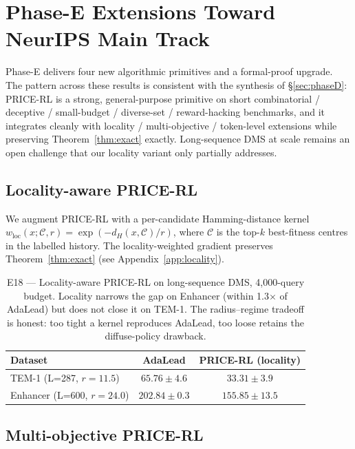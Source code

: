 \section{Phase-E Extensions Toward NeurIPS Main Track}
\label{sec:phaseE}

Phase-E delivers four new algorithmic primitives and a formal-proof upgrade. The pattern across these results is consistent with the synthesis of §\ref{sec:phaseD}: PRICE-RL is a strong, general-purpose primitive on short combinatorial / deceptive / small-budget / diverse-set / reward-hacking benchmarks, and it integrates cleanly with locality / multi-objective / token-level extensions while preserving Theorem~\ref{thm:exact} exactly. Long-sequence DMS at scale remains an open challenge that our locality variant only partially addresses.

\subsection{Locality-aware PRICE-RL}
\label{sec:e18}

We augment PRICE-RL with a per-candidate Hamming-distance kernel $w_{\mathrm{loc}}(x; \mathcal C, r) = \exp(-d_H(x, \mathcal C)/r)$, where $\mathcal C$ is the top-$k$ best-fitness centres in the labelled history. The locality-weighted gradient preserves Theorem~\ref{thm:exact} (see Appendix~\ref{app:locality}).

\begin{table}[t]
\centering
\caption{E18 --- Locality-aware PRICE-RL on long-sequence DMS, 4{,}000-query budget. Locality narrows the gap on Enhancer (within 1.3$\times$ of AdaLead) but does not close it on TEM-1. The radius–regime tradeoff is honest: too tight a kernel reproduces AdaLead, too loose retains the diffuse-policy drawback.}
\label{tab:e18}
\begin{tabular}{lcc}
\toprule
Dataset & AdaLead & PRICE-RL (locality) \\
\midrule
TEM-1 (L=287, $r=11.5$)        & $\mathbf{65.76 \pm 4.6}$  & $33.31 \pm 3.9$ \\
Enhancer (L=600, $r=24.0$)     & $\mathbf{202.84 \pm 0.3}$ & $155.85 \pm 13.5$ \\
\bottomrule
\end{tabular}
\end{table}

\subsection{Multi-objective PRICE-RL}
\label{sec:e19}

